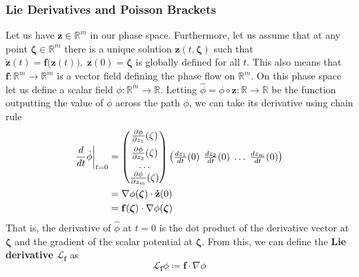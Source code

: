 \documentclass{article}
\begin{document}
    \subsubsection{Lie Derivatives and Poisson Brackets}

      Let us have $\mathbf{z} \in \mathbb{R}^m$ in our phase space. Furthermore, let us assume that at any point $\boldsymbol{\zeta} \in \mathbb{R}^m$ there is a unique solution $\mathbf{z}(t, \boldsymbol{\zeta})$ such that $\mathbf{\dot{z}}(t) = \mathbf{f}\big(\mathbf{z}(t)\big), \; \mathbf{z}(0) = \boldsymbol{\zeta}$ is globally defined for all $t$. This also means that $\mathbf{f}: \mathbb{R}^m \longrightarrow \mathbb{R}^m$ is a vector field defining the phase flow on $\mathbb{R}^m$. On this phase space let us define a scalar field $\phi: \mathbb{R}^m \longrightarrow \mathbb{R}$. Letting $\hat{\phi} = \phi \circ \mathbf{z}: \mathbb{R} \longrightarrow \mathbb{R}$ be the function outputting the value of $\phi$ across the path $\phi$, we can take its derivative using chain rule
      \begin{align*}
          \frac{d}{dt} \hat{\phi} \bigg|_{t=0} & = \begin{pmatrix}
          \frac{\partial \phi}{\partial z_1} (\zeta) \\[0.5em]
          \frac{\partial \phi}{\partial z_2} (\zeta) \\
          \ldots \\ 
          \frac{\partial \phi}{\partial z_m} (\zeta) \end{pmatrix} 
          \begin{pmatrix}
          \frac{d z_1}{dt} (0) &\hspace{-2mm} \frac{d z_2}{dt} (0) &\hspace{-2mm} \ldots &\hspace{-2mm} \frac{d z_m}{dt} (0) \end{pmatrix} \\
          & = \nabla \phi(\boldsymbol{\zeta}) \cdot \mathbf{\dot{z}} (0) \\ 
          & = \mathbf{f}(\boldsymbol{\zeta}) \cdot \nabla \phi(\boldsymbol{\zeta}) 
      \end{align*}
      That is, the derivative of $\hat{\phi}$ at $t = 0$ is the dot product of the derivative vector at $\boldsymbol{\zeta}$ and the gradient of the scalar potential at $\boldsymbol{\zeta}$. From this, we can define the \textbf{Lie derivative} $\mathcal{L}_\mathbf{f}$ as 
      \[\mathcal{L}_\mathbf{f} \phi \coloneqq \mathbf{f} \cdot \nabla \phi\]
\end{document}
